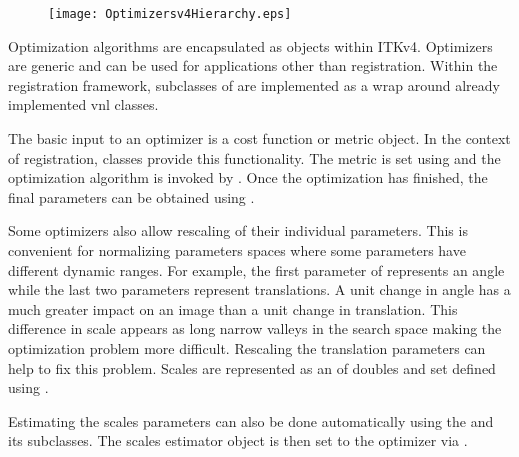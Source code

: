 


\begin{figure}
\center
\texttt{[image: Optimizersv4Hierarchy.eps]}
\label{fig:Optimizersv4Hierarchy}
\end{figure}

Optimization algorithms are encapsulated as 
objects within ITKv4. Optimizers are generic and can be used for applications
other than registration. Within the registration framework, subclasses of
 are implemented as a wrap
around already implemented vnl classes.


The basic input to an optimizer is a cost function or metric object. In the context
of registration,  classes provide this functionality.
The metric is set using  and
the optimization algorithm is invoked by .
Once the optimization has finished, the final parameters can be obtained
using .

Some optimizers also allow rescaling of their individual parameters. This is
convenient for normalizing parameters spaces where some parameters have
different dynamic ranges. For example, the first parameter of
 represents an angle while the last two parameters
represent translations. A unit change in angle has a much greater impact on an
image than a unit change in translation. This difference in scale appears as
long narrow valleys in the search space making the optimization problem more
difficult. Rescaling the translation parameters can help to fix this problem.
Scales are represented as an  of doubles and set defined using
.

Estimating the scales parameters can also be done automatically using the
 and its subclasses.
The scales estimator object is then set to the optimizer via
.

